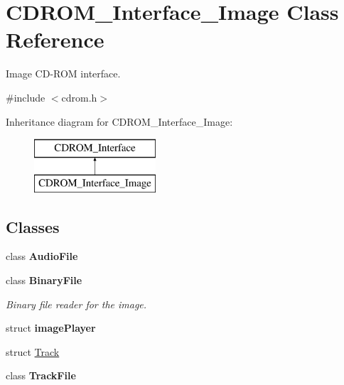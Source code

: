 \hypertarget{classCDROM__Interface__Image}{\section{C\-D\-R\-O\-M\-\_\-\-Interface\-\_\-\-Image Class Reference}
\label{classCDROM__Interface__Image}
}


Image C\-D-\/\-R\-O\-M interface.  




{\ttfamily \#include $<$cdrom.\-h$>$}

Inheritance diagram for C\-D\-R\-O\-M\-\_\-\-Interface\-\_\-\-Image\-:\begin{figure}[H]
\begin{center}
\leavevmode
\includegraphics[height=2.000000cm]{classCDROM__Interface__Image}
\end{center}
\end{figure}
\subsection*{Classes}
\begin{DoxyCompactItemize}
\item 
class {\bfseries Audio\-File}
\item 
class {\bfseries Binary\-File}
\begin{DoxyCompactList}\small\item\em Binary file reader for the image. \end{DoxyCompactList}\item 
struct {\bfseries image\-Player}
\item 
struct \hyperlink{structCDROM__Interface__Image_1_1Track}{Track}
\item 
class {\bfseries Track\-File}
\end{DoxyCompactItemize}
